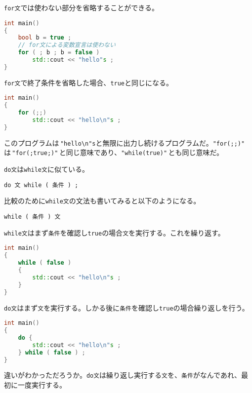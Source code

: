 \texttt{for文}では使わない部分を省略することができる。

\begin{lstlisting}[language={C++}]
int main()
{
    bool b = true ;
    // for文による変数宣言は使わない
    for ( ; b ; b = false )
        std::cout << "hello"s ;
}
\end{lstlisting}

\texttt{for文}で終了条件を省略した場合、\texttt{true}と同じになる。

\begin{lstlisting}[language={C++}]
int main()
{
    for (;;)
        std::cout << "hello\n"s ;
}
\end{lstlisting}

このプログラムは\,\texttt{"hello{\textbackslash}n"s}と無限に出力し続けるプログラムだ。\texttt{"for(;;)"}\,は\,\texttt{"for(;true;)"}\,と同じ意味であり、\texttt{"while(true)"}\,とも同じ意味だ。


\texttt{do文}は\texttt{while文}に似ている。

\begin{lstlisting}[style=grammar]
do 文 while ( 条件 ) ;
\end{lstlisting}

比較のために\texttt{while文}の文法も書いてみると以下のようになる。

\begin{lstlisting}[style=grammar]
while ( 条件 ) 文
\end{lstlisting}

\texttt{while文}はまず\texttt{条件}を確認し\texttt{true}の場合\texttt{文}を実行する。これを繰り返す。

\begin{lstlisting}[language={C++}]
int main()
{
    while ( false )
    {
        std::cout << "hello\n"s ;
    }
}
\end{lstlisting}

\texttt{do文}はまず\texttt{文}を実行する。しかる後に\texttt{条件}を確認し\texttt{true}の場合繰り返しを行う。

\begin{lstlisting}[language={C++}]
int main()
{
    do {
        std::cout << "hello\n"s ;
    } while ( false ) ;
}
\end{lstlisting}

違いがわかっただろうか。\texttt{do文}は繰り返し実行する\texttt{文}を、\texttt{条件}がなんであれ、最初に一度実行する。

